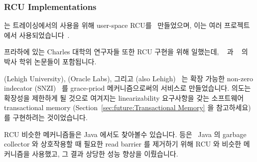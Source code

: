 \iffalse

\ppl{Maya}{Arbel} and \ppl{Hagit}{Attiya} of Technion took a more rigorous
approach~\cite{MayaArbel2014RCUtree} to an RCU-protected search tree that,
like Masstree, allows concurrent updates.
This paper includes a proof of correctness, including proof that all
operations on this tree are linearizable.
Unfortunately, this implementation achieves linearizability by incurring
the full latency of grace-period waits while holding locks, which degrades
scalability of update-only workloads.
One way around this problem is to abandon
linearizability~\cite{AndreasHaas2012FIFOisnt,PaulEMcKennneyAtomicTreeN4037},
however, Arbel and Attiya instead created an RCU variant that reduces
low-end grace-period latency.
Of course, nothing comes for free, and this RCU variant appears to hit
a scalability limit at about 32 CPUs.
Although there is much to be said for dropping linearizability, thus
gaining both performance and scalability, it is very good to see academics
experimenting with alternative RCU implementations.

\fi

\subsubsection{RCU Implementations}
\label{sec:defer:RCU Implementations}

 는 트레이싱에서의 사용을 위해 user-space
RCU를~\cite{MathieuDesnoyers2009URCU,MathieuDesnoyersPhD,MathieuDesnoyers2012URCU}
만들었으며, 이는 여러 프로젝트에서 사용되었습니다~\cite{MikeDay2013RCUqemu}.

프라하에 있는 Charles 대학의 연구자들 또한 RCU 구현을 위해 일했는데,
~\cite{AndrejPodzimek2010masters} 과
~\cite{AdamHraska2013RCUHelenOS} 의 박사 학위 논문들이
포함됩니다.

 (Lehigh University),  (Oracle Labs),
그리고  (also Lehigh)~\cite{Liu:2013:MSA:2549695.2549732}
는 확장 가능한 non-zero indecator (SNZI)~\cite{FaithEllen:2007:SNZI} 를
grace-priod 메커니즘으로써의 서비스로 만들었습니다.
의도는 확장성을 제한하게 될 것으로 여겨지는 linearizability 요구사항을 갖는
소프트웨어 transactional memory (Section~\ref{sec:future:Transactional Memory}
을 참고하세요) 를 구현하려는 것이었습니다.

RCU 비슷한 메커니즘들은 Java 에서도 찾아볼수 있습니다.
 등은~\cite{Sivaramakrishnan:2012:ERB:2258996.2259005}
Java 의 garbage collector 와 상호작용할 때 필요한 read barrier 를 제거하기 위해
RCU 와 비슷한 메커니즘을 사용했고, 그 결과 상당한 성능 향상을 이뤘습니다.


